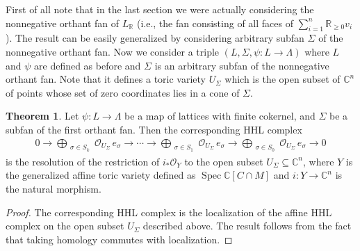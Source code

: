 \documentclass[11pt,reqno]{amsart}
\def\C {{\mathbb C}}
\def\R {{\mathbb R}}
\theoremstyle{definition}
\newtheorem{theorem}{Theorem}[section]
\numberwithin{equation}{section}
\begin{document}
First of all note that in the last section we were actually considering the nonnegative orthant fan of $L_{\R}$ (i.e., the fan consisting of all faces of $\sum_{i=1}^n \R_{\geq0} v_i$). The result can be easily generalized by considering arbitrary subfan $\Sigma$ of the nonnegative orthant fan. Now we consider a triple $(L,\Sigma,\psi: L\rightarrow \Lambda)$ where $L$ and $\psi$ are defined as before and $\Sigma$ is an arbitrary subfan of the nonnegative orthant fan. Note that it defines a toric variety $U_{\Sigma}$ which is the open subset of $\C^n$ of points whose set of zero coordinates lies in a cone of $\Sigma$.

\begin{theorem}\label{thm-2}
    Let $\psi:L\rightarrow\Lambda$ be a map of lattices with finite cokernel, and $\Sigma$ be a subfan of the first orthant fan. Then the corresponding HHL complex
    \begin{align}\label{eq-local-HHL-complex}
        0\rightarrow\bigoplus_{\substack{\sigma\in S_{k} }} \mathcal{O}_{U_{\Sigma}}\, e_{\sigma} \rightarrow \cdots \rightarrow \bigoplus_{\substack{\sigma\in S_{1}}} \mathcal{O}_{U_{\Sigma}}\, e_{\sigma} \rightarrow \bigoplus_{\substack{\sigma\in S_{0}}} \mathcal{O}_{U_{\Sigma}}\, e_{\sigma}\rightarrow0
    \end{align}
    is the resolution of the restriction of $i_*\mathcal{O}_{Y}$ to the open subset $U_{\Sigma}\subseteq\C^n$, where $Y$ is the generalized affine toric variety defined as $\operatorname{Spec}\C[C\cap M]$ and $i:Y\rightarrow\C^n$ is the natural morphism.
\end{theorem}
\begin{proof}
    The corresponding HHL complex is the localization of the affine HHL complex on the open subset $U_{\Sigma}$ described above. The result follows from the fact that taking homology commutes with localization.
\end{proof}
\end{document}
